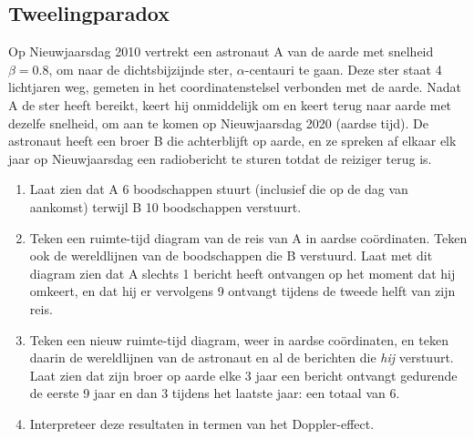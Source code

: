 \subsection{Tweelingparadox}
Op Nieuwjaarsdag 2010 vertrekt een astronaut A van de aarde met
snelheid $\beta=0.8$, om naar de dichtsbijzijnde ster, $\alpha$-centauri te gaan. Deze ster staat 4 lichtjaren weg, gemeten in het
coordinatenstelsel verbonden met de aarde. Nadat A de ster heeft
bereikt, keert hij onmiddelijk om en keert terug naar aarde met
dezelfe snelheid, om aan te komen op Nieuwjaarsdag 2020 (aardse
tijd). De astronaut heeft een broer B die achterblijft op aarde, en ze
spreken af elkaar elk jaar op Nieuwjaarsdag een radiobericht te sturen totdat
de reiziger terug is.
\begin{enumerate}
\item Laat zien dat A 6 boodschappen stuurt (inclusief die op de dag van aankomst) terwijl B 10 boodschappen verstuurt.
\item Teken een ruimte-tijd diagram van de reis van A in aardse co\"{o}rdinaten. Teken ook de wereldlijnen van de 
boodschappen die B verstuurd. Laat met dit diagram zien dat A slechts 1 bericht heeft ontvangen op het moment dat hij omkeert,
en dat hij er vervolgens 9 ontvangt tijdens de tweede helft van zijn reis.
\item
Teken een nieuw ruimte-tijd diagram, weer in aardse co\"{o}rdinaten, en teken daarin de wereldlijnen van de astronaut en al de
berichten die {\it hij} verstuurt. Laat zien dat zijn broer op aarde elke 3 jaar een bericht ontvangt gedurende de eerste 9 jaar en dan
3 tijdens het laatste jaar: een totaal van 6.
\item Interpreteer deze resultaten in termen van het Doppler-effect.

\end{enumerate}





